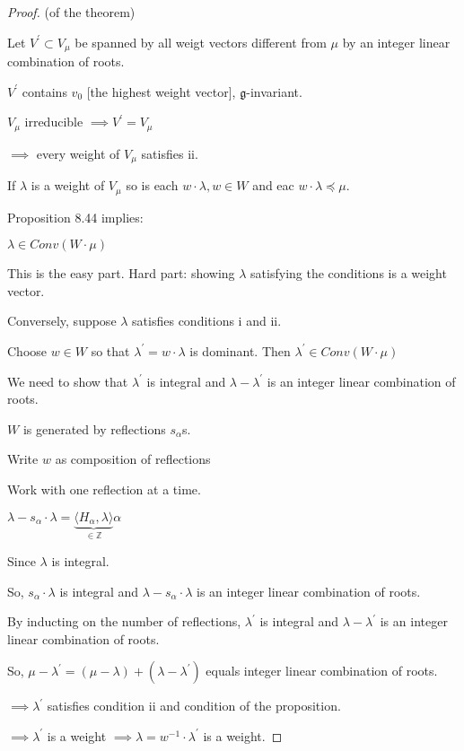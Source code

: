 \documentclass{article}
\theoremstyle{definition}
\begin{document}
\begin{proof}
    (of the theorem)

    Let \(V^{\prime} \subset V_\mu\) be spanned by all weigt vectors different from \(\mu\) by an integer linear combination of roots.
    
    \(V^{\prime}\) contains \(v_0\) [the highest weight vector], \(\mathfrak{g}\)-invariant.
    
    \(V_\mu\) irreducible \(\implies V^{\prime} =V_\mu\)

    \(\implies\) every weight of \(V_\mu\) satisfies ii.
    
    If \(\lambda\) is a weight of \(V_\mu\) so is each \(w\cdot \lambda, w\in W\) and eac \(w\cdot \lambda \preceq \mu\).
    
    Proposition 8.44 implies:

    \(\lambda \in Conv(W\cdot\mu)\)
    
    This is the easy part. Hard part: showing \(\lambda\) satisfying the conditions is a weight vector.
    
    Conversely, suppose \(\lambda\) satisfies conditions i and ii.
    
    Choose \(w\in W\) so that \(\lambda ^{\prime} = w\cdot \lambda\) is dominant. Then \(\lambda ^{\prime} \in Conv(W\cdot\mu)\)
    
    We need to show that \(\lambda ^{\prime} \) is integral and \(\lambda - \lambda ^{\prime} \) is an integer linear combination of roots.
    
    \(W\) is generated by reflections \(s_\alpha\)s.
    
    Write \(w\) as composition of reflections

    Work with one reflection at a time.

    \(\lambda - s_\alpha \cdot \lambda = \underbrace{\langle H_\alpha , \lambda \rangle}_{\in\mathbb{Z}} \alpha  \) 
    
    Since \(\lambda\) is integral.
    
    So, \(s_\alpha \cdot \lambda\) is integral and \(\lambda - s_\alpha \cdot \lambda\) is an integer linear combination of roots.
    
    By inducting on the number of reflections, \(\lambda^{\prime} \) is integral and \(\lambda - \lambda ^{\prime} \) is an integer linear combination of roots.
    
    So, \(\mu - \lambda ^{\prime} = (\mu - \lambda )+(\lambda - \lambda ^{\prime} )\) equals integer linear combination of roots.
    
    \(\implies \lambda ^{\prime}\) satisfies condition ii and condition of the proposition.
    
    \(\implies \lambda ^{\prime} \) is a weight \(\implies  \lambda = w ^{-1} \cdot \lambda ^{\prime} \) is a weight.  
    
\end{proof}
\end{document}
